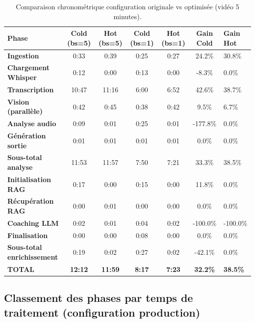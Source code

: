 ﻿\documentclass[12pt,a4paper]{article}
\begin{document}
\begin{table}[H]
    \centering
    \scriptsize
    \begin{tabularx}{\textwidth}{@{}lcccccX@{}}
        \toprule
        \textbf{Phase} & \textbf{Cold (bs=5)} & \textbf{Hot (bs=5)} & \textbf{Cold (bs=1)} & \textbf{Hot (bs=1)} & \textbf{Gain Cold} & \textbf{Gain Hot} \\
        \midrule
        \textbf{Ingestion} & 0:33 & 0:39 & 0:25 & 0:27 & 24.2\% & 30.8\% \\
        \midrule
        \textbf{Chargement Whisper} & 0:12 & 0:00 & 0:13 & 0:00 & -8.3\% & 0.0\% \\
        \textbf{Transcription} & 10:47 & 11:16 & 6:00 & 6:52 & 42.6\% & 38.7\% \\
        \textbf{Vision (parallèle)} & 0:42 & 0:45 & 0:38 & 0:42 & 9.5\% & 6.7\% \\
        \textbf{Analyse audio} & 0:09 & 0:01 & 0:25 & 0:01 & -177.8\% & 0.0\% \\
        \textbf{Génération sortie} & 0:01 & 0:01 & 0:01 & 0:01 & 0.0\% & 0.0\% \\
        \midrule
        \textbf{Sous-total analyse} & 11:53 & 11:57 & 7:50 & 7:21 & 33.3\% & 38.5\% \\
        \midrule
        \textbf{Initialisation RAG} & 0:17 & 0:00 & 0:15 & 0:00 & 11.8\% & 0.0\% \\
        \textbf{Récupération RAG} & 0:00 & 0:01 & 0:00 & 0:00 & 0.0\% & 0.0\% \\
        \textbf{Coaching LLM} & 0:02 & 0:01 & 0:04 & 0:02 & -100.0\% & -100.0\% \\
        \textbf{Finalisation} & 0:00 & 0:00 & 0:08 & 0:00 & 0.0\% & 0.0\% \\
        \midrule
        \textbf{Sous-total enrichissement} & 0:19 & 0:02 & 0:27 & 0:02 & -42.1\% & 0.0\% \\
        \midrule
        \textbf{TOTAL} & \textbf{12:12} & \textbf{11:59} & \textbf{8:17} & \textbf{7:23} & \textbf{32.2\%} & \textbf{38.5\%} \\
        \bottomrule
    \end{tabularx}
    \caption{Comparaison chronométrique configuration originale vs optimisée (vidéo 5 minutes).}
\end{table}

\subsection{Classement des phases par temps de traitement (configuration production)}
\end{document}
